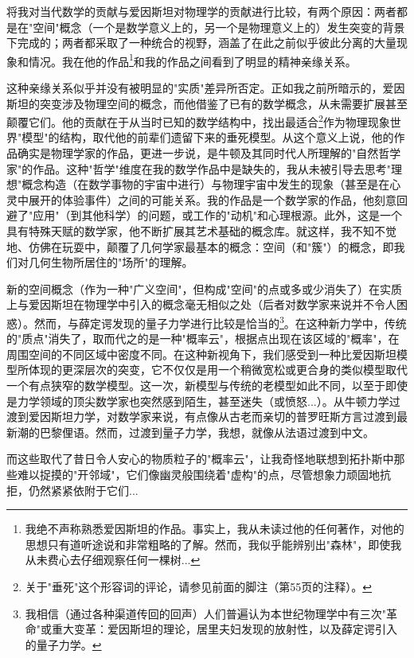 将我对当代数学的贡献与爱因斯坦对物理学的贡献进行比较，有两个原因：两者都是在"空间"概念（一个是数学意义上的，另一个是物理意义上的）发生突变的背景下完成的；两者都采取了一种统合的视野，涵盖了在此之前似乎彼此分离的大量现象和情况。我在他的作品\footnote{我绝不声称熟悉爱因斯坦的作品。事实上，我从未读过他的任何著作，对他的思想只有道听途说和非常粗略的了解。然而，我似乎能辨别出"森林"，即使我从未费心去仔细观察任何一棵树...}和我的作品之间看到了明显的精神亲缘关系。

这种亲缘关系似乎并没有被明显的"实质"差异所否定。正如我之前所暗示的，爱因斯坦的突变涉及物理空间的概念，而他借鉴了已有的数学概念，从未需要扩展甚至颠覆它们。他的贡献在于从当时已知的数学结构中，找出最适合\footnote{关于"垂死"这个形容词的评论，请参见前面的脚注（第55页的注释）。}作为物理现象世界"模型"的结构，取代他的前辈们遗留下来的垂死模型。从这个意义上说，他的作品确实是物理学家的作品，更进一步说，是牛顿及其同时代人所理解的"自然哲学家"的作品。这种"哲学"维度在我的数学作品中是缺失的，我从未被引导去思考"理想"概念构造（在数学事物的宇宙中进行）与物理宇宙中发生的现象（甚至是在心灵中展开的体验事件）之间的可能关系。我的作品是一个数学家的作品，他刻意回避了"应用"（到其他科学）的问题，或工作的"动机"和心理根源。此外，这是一个具有特殊天赋的数学家，他不断扩展其艺术基础的概念库。就这样，我不知不觉地、仿佛在玩耍中，颠覆了几何学家最基本的概念：空间（和"簇"）的概念，即我们对几何生物所居住的"场所"的理解。

新的空间概念（作为一种"广义空间"，但构成"空间"的点或多或少消失了）在实质上与爱因斯坦在物理学中引入的概念毫无相似之处（后者对数学家来说并不令人困惑）。然而，与薛定谔发现的量子力学进行比较是恰当的\footnote{我相信（通过各种渠道传回的回声）人们普遍认为本世纪物理学中有三次"革命"或重大变革：爱因斯坦的理论，居里夫妇发现的放射性，以及薛定谔引入的量子力学。}。在这种新力学中，传统的"质点"消失了，取而代之的是一种"概率云"，根据点出现在该区域的"概率"，在周围空间的不同区域中密度不同。在这种新视角下，我们感受到一种比爱因斯坦模型所体现的更深层次的突变，它不仅仅是用一个稍微宽松或更合身的类似模型取代一个有点狭窄的数学模型。这一次，新模型与传统的老模型如此不同，以至于即使是力学领域的顶尖数学家也突然感到陌生，甚至迷失（或愤怒...）。从牛顿力学过渡到爱因斯坦力学，对数学家来说，有点像从古老而亲切的普罗旺斯方言过渡到最新潮的巴黎俚语。然而，过渡到量子力学，我想，就像从法语过渡到中文。

而这些取代了昔日令人安心的物质粒子的"概率云"，让我奇怪地联想到拓扑斯中那些难以捉摸的"开邻域"，它们像幽灵般围绕着"虚构"的点，尽管想象力顽固地抗拒，仍然紧紧依附于它们...
